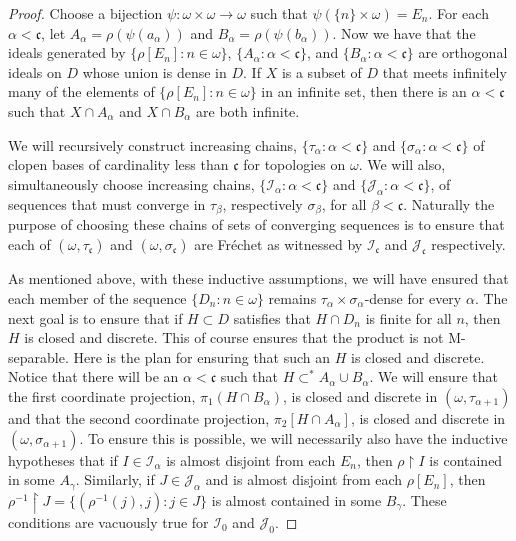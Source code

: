 \documentclass{amsart}
\theoremstyle{definition}
\theoremstyle{remark}
\begin{document}
\begin{proof}
Choose a bijection $\psi : \omega\times \omega \rightarrow \omega$
such that $\psi(\{n\}\times \omega) = E_n$. 
For each $\alpha<\mathfrak c$, let $A_\alpha = \rho(\psi(a_\alpha))$
and $B_\alpha = \rho(\psi(b_\alpha))$. Now we have 
that the ideals generated by $\{ \rho[E_n] : n\in \omega\}$,
 $\{ A_\alpha : \alpha < \mathfrak c\}$, and 
  $\{B_\alpha : \alpha < \mathfrak c\}$ are orthogonal ideals
  on $D$ whose union is dense in $D$. If $X$ is a subset
  of $D$ that meets infinitely many of the elements
  of $\{ \rho[E_n] : n\in\omega\}$ in an infinite set,
   then there is an $\alpha<\mathfrak c$ such that
    $X\cap A_\alpha$ and $X\cap B_\alpha$ are both infinite.
     

   We will recursively construct increasing chains, 
    $\{\tau_\alpha : \alpha < \mathfrak c\}$ and
     $\{ \sigma_\alpha : \alpha < \mathfrak c\}$ 
     of clopen bases of cardinality less than $\mathfrak c$
     for topologies on $\omega$. We will also, simultaneously
     choose increasing chains, $\{
     \mathcal I_\alpha : \alpha <\mathfrak c\}$
     and   $\{\mathcal J_\alpha : \alpha < \mathfrak c\}$,
      of sequences that must converge in $\tau_\beta$, 
      respectively $\sigma_\beta$, for all $\beta < \mathfrak c$.
      Naturally the purpose of choosing these chains of
      sets of converging sequences is to ensure that
      each of $(\omega,\tau_{\mathfrak c})$
      and $(\omega,\sigma_{\mathfrak c})$ are Fr\'echet as
      witnessed by $\mathcal I_{\mathfrak c}$ and
       $\mathcal J_{\mathfrak c}$ respectively.

       As mentioned above, with these inductive assumptions,
       we will have ensured that each member
       of the sequence $\{ D_n : n\in\omega\}$
       remains 
   $\tau_\alpha\times \sigma_\alpha$-dense for
        every $\alpha$.
        The next goal is to ensure that  
        if $H\subset D$ satisfies
        that $H\cap D_n $ is finite for all
         $n$, then $H$ is closed and discrete.
         This of course ensures that the product
         is not M-separable. 
    Here is the plan for ensuring that such an
     $H$ is closed and discrete. Notice that
     there will be an $\alpha<\mathfrak c$
     such that $H\subset^* A_\alpha\cup B_\alpha$.
     We will ensure that the first coordinate projection,
     $\pi_1(H\cap B_\alpha)$, is 
     closed and discrete in $(\omega,\tau_{\alpha+1})$
     and that the second coordinate projection,
     $\pi_2[H\cap A_\alpha]$, is closed
     and discrete in $(\omega,\sigma_{\alpha+1})$.
     To ensure this is possible, we will necessarily 
     also have 
     the inductive hypotheses that
    if $I\in\mathcal I_\alpha$ is almost
    disjoint from each $E_n$, then
     $\rho\restriction I $ is contained in
     some $A_\gamma$.
     Similarly, if $J\in \mathcal J_\alpha$
     and is almost disjoint from 
     each $\rho[E_n]$, then $\rho^{-1}\restriction J
      = \{ (\rho^{-1}(j) , j) : j\in J\}$ is 
      almost contained in some  $B_\gamma$.
      These conditions are vacuously true for $\mathcal I_0$
      and $\mathcal J_0$.
     

\end{proof}
\end{document}
